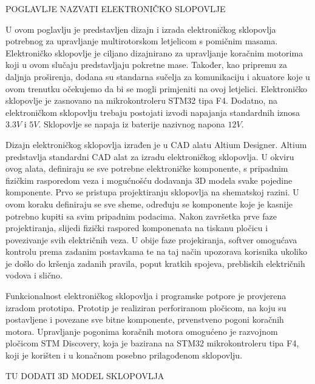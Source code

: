 \documentclass[11pt,a4paper]{article}
\begin{document}
POGLAVLJE NAZVATI ELEKTRONIČKO SLOPOVLJE

U ovom poglavlju je predstavljen dizajn i izrada elektroničkog sklopovlja potrebnog za upravljanje multirotorskom letjelicom s pomičnim masama. Elektroničko sklopovlje je ciljano dizajnirano za upravljanje koračnim motorima koji u ovom slučaju predstavljaju pokretne mase. Također, kao pripremu za daljnja proširenja, dodana su standarna sučelja za komunikaciju i akuatore koje u ovom trenutku očekujemo da bi se mogli primjeniti na ovoj letjelici. Elektroničko sklopovlje je zasnovano na mikrokontroleru STM32 tipa F4. Dodatno, na elektroničkom sklopovlju trebaju postojati izvodi napajanja standardnih iznosa $3.3 V$ i $5 V$. Sklopovlje se napaja iz baterije nazivnog napona $12 V$. 

Dizajn elektroničkog sklopovlja izrađen je u CAD alatu Altium Designer. Altium predstavlja standardni CAD alat za izradu elektroničkog sklopovlja. U okviru ovog alata, definiraju se sve potrebne elektroničke komponente, s pripadnim fizičkim rasporedom veza i mogućnošću dodavanja 3D modela svake pojedine komponente. Prvo se pristupa projektiranju sklopovlja na shematskoj razini. U ovom koraku definiraju se sve sheme, određuju se komponente koje je kasnije potrebno kupiti sa svim pripadnim podacima. Nakon završetka prve faze projektiranja, slijedi fizički raspored komponenata na tiskanu pločicu i povezivanje svih električnih veza. U obije faze projekiranja, softver omogućava kontrolu prema zadanim postavkama te na taj način upozorava korisnika ukoliko je došlo do kršenja zadanih pravila, poput kratkih spojeva, prebliskih električnih vodova i slično.

Funkcionalnost elektroničkog sklopovlja i programske potpore je provjerena izradom prototipa. Prototip je realiziran perforiranom pločicom, na koju su postavljene i povezane sve bitne komponente, prvenstveno pogoni koračnih motora. Upravljanje pogonima koračnih motora omogućeno je razvojnom pločicom STM Discovery, koja je bazirana na STM32 mikrokontroleru tipa F4, koji je korišten i u konačnom posebno prilagođenom sklopovlju.

TU DODATI 3D MODEL SKLOPOVLJA
\end{document}
